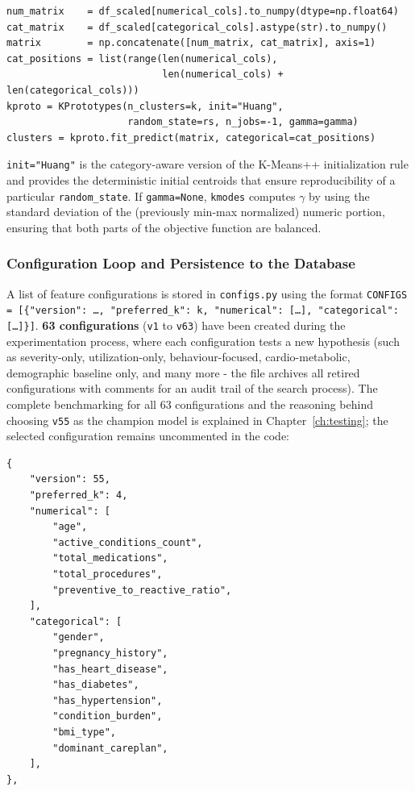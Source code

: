 \begin{lstlisting}[style=pythonstyle]
num_matrix    = df_scaled[numerical_cols].to_numpy(dtype=np.float64)
cat_matrix    = df_scaled[categorical_cols].astype(str).to_numpy()
matrix        = np.concatenate([num_matrix, cat_matrix], axis=1)
cat_positions = list(range(len(numerical_cols),
                           len(numerical_cols) + len(categorical_cols)))
kproto = KPrototypes(n_clusters=k, init="Huang",
                     random_state=rs, n_jobs=-1, gamma=gamma)
clusters = kproto.fit_predict(matrix, categorical=cat_positions)
\end{lstlisting}

\texttt{init="Huang"} is the category-aware version of the K-Means++ initialization rule and provides the deterministic initial centroids that ensure reproducibility of a particular \texttt{random\_state}. If \texttt{gamma=None}, \texttt{kmodes} computes \(\gamma\) by using the standard deviation of the (previously min-max normalized) numeric portion, ensuring that both parts of the objective function are balanced.

\subsubsection*{Configuration Loop and Persistence to the Database}

A list of feature configurations is stored in \texttt{configs.py} using the format \texttt{CONFIGS = [\{"version": \dots, \allowbreak "preferred\_\allowbreak k": k, \allowbreak "numerical": [\dots], \allowbreak "categorical": [\dots]\}]}. \textbf{63 configurations} (\texttt{v1} to \texttt{v63}) have been created during the experimentation process, where each configuration tests a new hypothesis (such as severity-only, utilization-only, behaviour-focused, cardio-metabolic, demographic baseline only, and many more - the file archives all retired configurations with comments for an audit trail of the search process). The complete benchmarking for all 63 configurations and the reasoning behind choosing \texttt{v55} as the champion model is explained in Chapter~\ref{ch:testing}; the selected configuration remains uncommented in the code:

\begin{lstlisting}[style=pythonstyle]
{
    "version": 55,
    "preferred_k": 4,
    "numerical": [
        "age",
        "active_conditions_count",
        "total_medications",
        "total_procedures",
        "preventive_to_reactive_ratio",
    ],
    "categorical": [
        "gender",
        "pregnancy_history",
        "has_heart_disease",
        "has_diabetes",
        "has_hypertension",
        "condition_burden",
        "bmi_type",
        "dominant_careplan",
    ],
},
\end{lstlisting}

